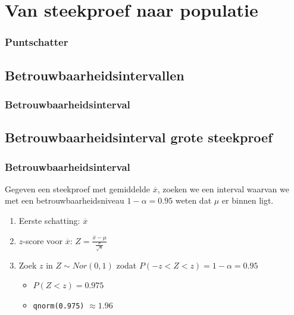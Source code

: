 \documentclass{beamer}
\begin{document}
\section{Van steekproef naar populatie}
\sectionframelogo{}

\begin{frame}
  \frametitle{Puntschatter}
\end{frame}

\subsection{Betrouwbaarheidsintervallen}
\begin{frame}
  \frametitle{Betrouwbaarheidsinterval}
\end{frame}

\subsection{Betrouwbaarheidsinterval grote steekproef}


\begin{frame}
\frametitle{Betrouwbaarheidsinterval}

Gegeven een steekproef met gemiddelde $\overline{x}$, zoeken we een interval waarvan we met een betrouwbaarheidsniveau $1 - \alpha = 0.95$ weten dat $\mu$ er binnen ligt.

\begin{enumerate}
  \item<+-> Eerste schatting: $\overline{x}$
  \item<+-> $z$-score voor $\overline{x}$: $Z = \frac{\overline{x} - \mu}{\frac{\sigma}{\sqrt{n}}}$
  \item<+-> Zoek $z$ in $Z \sim Nor(0, 1)$ zodat $P(-z < Z < z) = 1 - \alpha = 0.95$
    \begin{itemize}
      \item<+-> $P(Z < z) = 0.975$
      \item<+-> \texttt{qnorm(0.975)} $ \approx 1.96$ 
    \end{itemize}
\end{enumerate}

\end{frame}
\end{document}
